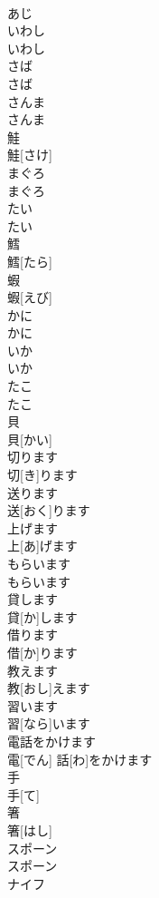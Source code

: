 \documentclass[8pt]{extreport}
\begin{document}
\begin{CJK}{UTF8}{min}
\\	あじ		
\\	いわし	
\\	いわし		
\\	さば	
\\	さば		
\\	さんま	
\\	さんま		
\\	鮭	
\\	鮭[さけ]		
\\	まぐろ	
\\	まぐろ		
\\	たい	
\\	たい		
\\	鱈	
\\	鱈[たら]		
\\	蝦	
\\	蝦[えび]		
\\	かに	
\\	かに		
\\	いか	
\\	いか		
\\	たこ	
\\	たこ		
\\	貝	
\\	貝[かい]		
\\	切ります	
\\	切[き]ります		
\\	送ります	
\\	送[おく]ります		
\\	上げます	
\\	上[あ]げます		
\\	もらいます	
\\	もらいます		
\\	貸します	
\\	貸[か]します		
\\	借ります	
\\	借[か]ります		
\\	教えます	
\\	教[おし]えます		
\\	習います	
\\	習[なら]います		
\\	電話をかけます	
\\	電[でん] 話[わ]をかけます		
\\	手	
\\	手[て]		
\\	箸	
\\	箸[はし]		
\\	スポーン	
\\	スポーン		
\\	ナイフ	

\end{CJK}
\end{document}
